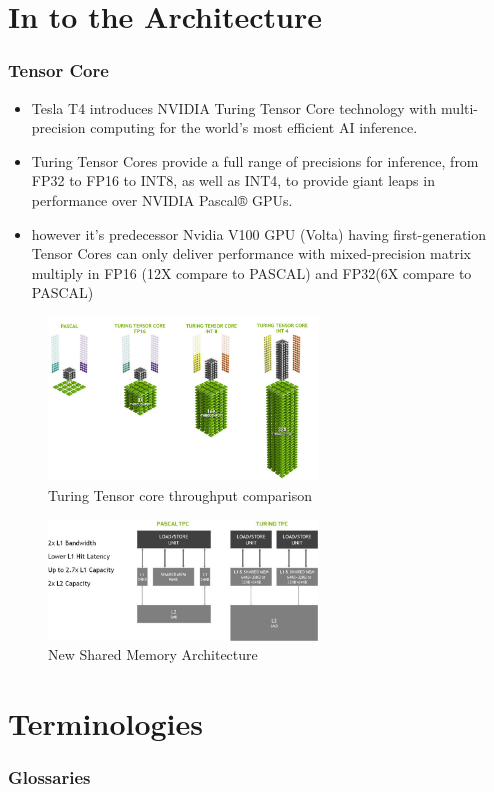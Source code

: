 \documentclass[xcolor=x11names,table]{beamer}
\begin{document}
\section{In to the Architecture}
    \begin{frame}[allowframebreaks]
    \frametitle{Tensor Core}
        \begin{itemize}
            \item Tesla T4 introduces NVIDIA Turing Tensor Core technology with multi-precision computing for the world’s most efficient AI inference. 
            
            \item Turing Tensor Cores provide a full range of precisions for inference, from FP32 to FP16 to INT8, as well as INT4, to provide giant leaps in performance over NVIDIA Pascal® GPUs.
            
            \item however it's predecessor Nvidia V100 GPU (Volta) having first-generation Tensor Cores can only deliver performance with mixed-precision matrix multiply in FP16 (12X compare to PASCAL) and FP32(6X compare to PASCAL)
        \end{itemize}
        
        \begin{figure}[H]
            \includegraphics[width=270px]{refs/turing-throughput-tensor.jpg}
            \caption{Turing Tensor core throughput comparison}
        \end{figure}
        
        \begin{figure}
            \centering
            \includegraphics[width=270px]{image3.jpg}
            \caption{New Shared Memory Architecture}
            \label{fig:newSM}
        \end{figure}
    \end{frame}

\section{Terminologies}
    \begin{frame}[allowframebreaks]
    \frametitle{Glossaries}
        \printglossaries
    \end{frame}
\end{document}
